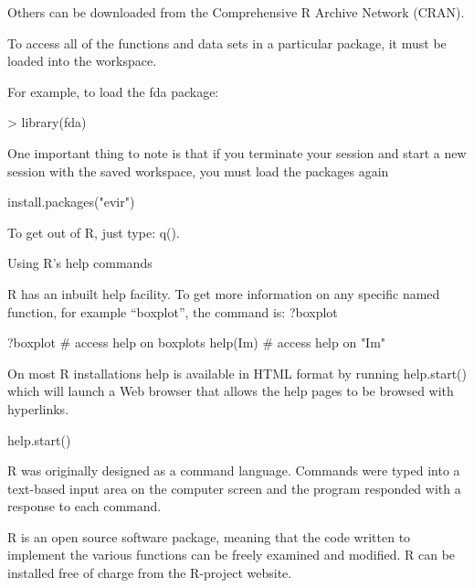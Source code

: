 \begin{frame}
\begin{frame}
Others can be downloaded from the Comprehensive R Archive Network (CRAN).

To access all of the functions and data sets in a particular package, it must be loaded into the workspace. 
\end{frame}
\begin{frame}

For example, to load the fda package:

> library(fda)

One important thing to note is that if you terminate your session and start a new session with the saved workspace, you must load  the packages again



install.packages("evir")
 
To get out of R, just type: q(). 

\end{frame}
\begin{frame}

Using R's help commands

R has an inbuilt help facility. To get more information on any specific named function, for example “boxplot”, the command is: ?boxplot


?boxplot		# access help on boxplots
help(Im)        # access help on "Im"

\end{frame}
\begin{frame}

On most R installations help is available in HTML format by running help.start() which will launch a Web browser that allows the help pages to be browsed with hyperlinks. 
 



help.start()

 
 

R was originally designed as a command language.  
Commands were typed into a text-based input area on the computer screen and the program responded with a response to each command.

R is an open source software package, meaning that the code written to implement the various functions can be freely examined and modified.
R can be installed free of charge from the R-project website.


\end{frame}
\end{frame}
